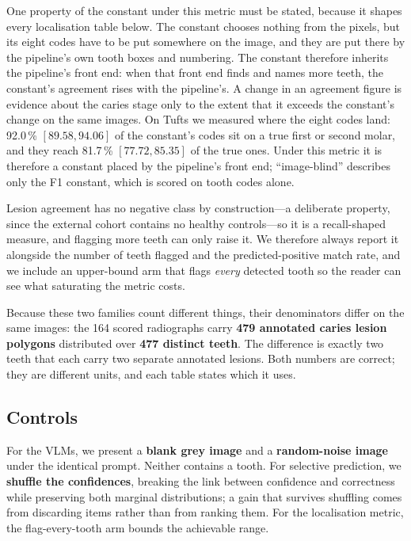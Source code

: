 \documentclass[conference]{IEEEtran}
\begin{document}
One property of the constant under this metric must be stated, because it shapes
every localisation table below. The constant chooses nothing from the pixels, but
its eight codes have to be put somewhere on the image, and they are put there by
the pipeline's own tooth boxes and numbering. The constant therefore inherits the
pipeline's front end: when that front end finds and names more teeth, the
constant's agreement rises with the pipeline's. A change in an agreement figure
is evidence about the caries stage only to the extent that it exceeds the
constant's change on the same images. On Tufts we measured where the eight codes
land: 92.0\,\% $[89.58, 94.06]$ of the constant's codes sit on a true first or
second molar, and they reach 81.7\,\% $[77.72, 85.35]$ of the true ones. Under this
metric it is therefore a constant placed by the pipeline's front end; ``image-blind''
describes only the F1 constant, which is scored on tooth codes alone.

Lesion agreement has no negative class by construction---a deliberate property,
since the external cohort contains no healthy controls---so it is a recall-shaped
measure, and flagging more teeth can only raise it. We therefore always report it
alongside the number of teeth flagged and the predicted-positive match rate, and
we include an upper-bound arm that flags \emph{every} detected tooth so the
reader can see what saturating the metric costs.

Because these two families count different things, their denominators differ on
the same images: the 164 scored radiographs carry \textbf{479 annotated caries
lesion polygons} distributed over \textbf{477 distinct teeth}. The difference is
exactly two teeth that each carry two separate annotated lesions. Both numbers
are correct; they are different units, and each table states which it uses.

\subsection{Controls}
For the VLMs, we present a \textbf{blank grey image} and a \textbf{random-noise
image} under the identical prompt. Neither contains a tooth. For selective
prediction, we \textbf{shuffle the confidences}, breaking the link between
confidence and correctness while preserving both marginal distributions; a gain
that survives shuffling comes from discarding items rather than from ranking
them. For the localisation metric, the flag-every-tooth arm bounds the achievable
range.
\end{document}
